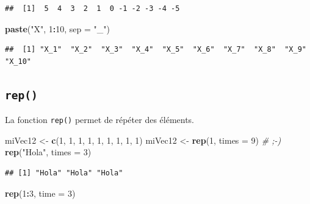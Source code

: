 \documentclass[
]{book}
\newenvironment{Shaded}{\begin{snugshade}}{\end{snugshade}}
\newcommand{\CommentTok}[1]{\textcolor[rgb]{0.56,0.35,0.01}{\textit{#1}}}
\newcommand{\DataTypeTok}[1]{\textcolor[rgb]{0.13,0.29,0.53}{#1}}
\newcommand{\DecValTok}[1]{\textcolor[rgb]{0.00,0.00,0.81}{#1}}
\newcommand{\KeywordTok}[1]{\textcolor[rgb]{0.13,0.29,0.53}{\textbf{#1}}}
\newcommand{\NormalTok}[1]{#1}
\newcommand{\OperatorTok}[1]{\textcolor[rgb]{0.81,0.36,0.00}{\textbf{#1}}}
\newcommand{\StringTok}[1]{\textcolor[rgb]{0.31,0.60,0.02}{#1}}
\begin{document}
\begin{verbatim}
##  [1]  5  4  3  2  1  0 -1 -2 -3 -4 -5
\end{verbatim}

\begin{Shaded}
\begin{Highlighting}[]
\KeywordTok{paste}\NormalTok{(}\StringTok{"X"}\NormalTok{, }\DecValTok{1}\OperatorTok{:}\DecValTok{10}\NormalTok{, }\DataTypeTok{sep =} \StringTok{"_"}\NormalTok{)}
\end{Highlighting}
\end{Shaded}

\begin{verbatim}
##  [1] "X_1"  "X_2"  "X_3"  "X_4"  "X_5"  "X_6"  "X_7"  "X_8"  "X_9"  "X_10"
\end{verbatim}

\hypertarget{l015rep}{%
\subsection{\texorpdfstring{\texttt{rep()}}{rep()}}\label{l015rep}}

La fonction \texttt{rep()} permet de répéter des éléments.

\begin{Shaded}
\begin{Highlighting}[]
\NormalTok{miVec12 <-}\StringTok{ }\KeywordTok{c}\NormalTok{(}\DecValTok{1}\NormalTok{, }\DecValTok{1}\NormalTok{, }\DecValTok{1}\NormalTok{, }\DecValTok{1}\NormalTok{, }\DecValTok{1}\NormalTok{, }\DecValTok{1}\NormalTok{, }\DecValTok{1}\NormalTok{, }\DecValTok{1}\NormalTok{, }\DecValTok{1}\NormalTok{)}
\NormalTok{miVec12 <-}\StringTok{ }\KeywordTok{rep}\NormalTok{(}\DecValTok{1}\NormalTok{, }\DataTypeTok{times =} \DecValTok{9}\NormalTok{) }\CommentTok{# ;-)}
\KeywordTok{rep}\NormalTok{(}\StringTok{"Hola"}\NormalTok{, }\DataTypeTok{times =} \DecValTok{3}\NormalTok{)}
\end{Highlighting}
\end{Shaded}

\begin{verbatim}
## [1] "Hola" "Hola" "Hola"
\end{verbatim}

\begin{Shaded}
\begin{Highlighting}[]
\KeywordTok{rep}\NormalTok{(}\DecValTok{1}\OperatorTok{:}\DecValTok{3}\NormalTok{, }\DataTypeTok{time =} \DecValTok{3}\NormalTok{)}
\end{Highlighting}
\end{Shaded}
\end{document}

